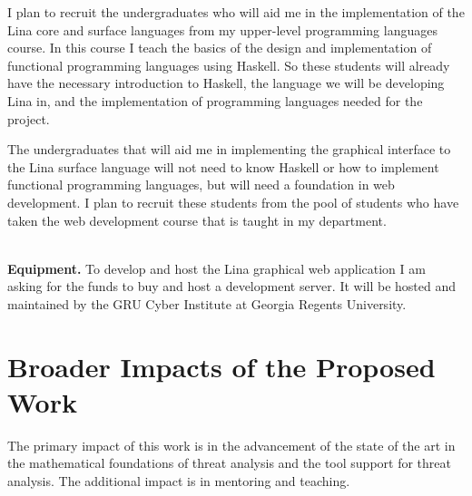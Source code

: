 \begin{full}
I plan to recruit the undergraduates who will aid me in the
implementation of the Lina core and surface languages from my
upper-level programming languages course.  In this course I teach the
basics of the design and implementation of functional programming
languages using Haskell.  So these students will already have the
necessary introduction to Haskell, the language we will be developing
Lina in, and the implementation of programming languages needed for
the project.

The undergraduates that will aid me in implementing the graphical
interface to the Lina surface language will not need to know Haskell
or how to implement functional programming languages, but will need a
foundation in web development.  I plan to recruit these students from
the pool of students who have taken the web development course that is
taught in my department.

\ \\
\noindent
\textbf{Equipment.}  To develop and host the Lina graphical web
application I am asking for the funds to buy and host a development
server.  It will be hosted and maintained by the GRU Cyber Institute
at Georgia Regents University.


\section{Broader Impacts of the Proposed Work}
\label{sec:broader_impacts_of_the_proposed_work}

The primary impact of this work is in the advancement of the state of
the art in the mathematical foundations of threat analysis and the
tool support for threat analysis.  The additional impact is in
mentoring and teaching.


\end{full}
